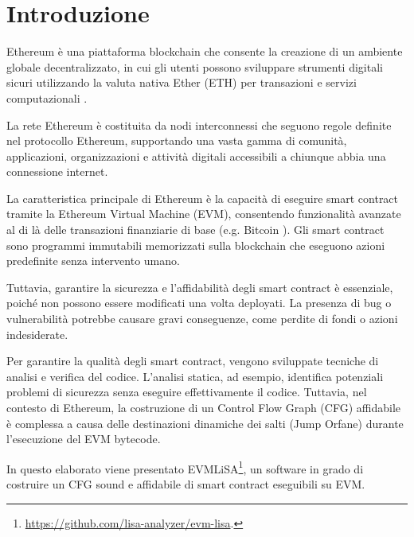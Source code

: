 \chapter{Introduzione}\label{chapter:introduzione}
Ethereum è una piattaforma blockchain che consente la creazione di un ambiente globale decentralizzato, 
in cui gli utenti possono sviluppare strumenti digitali sicuri utilizzando la valuta nativa Ether (ETH) per transazioni e servizi 
computazionali \cite{wood2014ethereum}.

La rete Ethereum è costituita da nodi interconnessi che seguono regole definite nel protocollo Ethereum, supportando una vasta 
gamma di comunità, applicazioni, organizzazioni e attività digitali accessibili a chiunque abbia una connessione internet.

La caratteristica principale di Ethereum è la capacità di eseguire smart contract tramite la Ethereum Virtual Machine (EVM), 
consentendo funzionalità avanzate al di là delle transazioni finanziarie di base (e.g. Bitcoin \cite{nakamoto2008bitcoin}). 
Gli smart contract sono programmi immutabili memorizzati sulla blockchain che eseguono azioni predefinite senza intervento umano.

Tuttavia, garantire la sicurezza e l’affidabilità degli smart contract è essenziale, poiché non possono essere modificati una 
volta deployati. La presenza di bug o vulnerabilità potrebbe causare gravi conseguenze, come perdite di fondi o azioni indesiderate.

Per garantire la qualità degli smart contract, vengono sviluppate tecniche di analisi e verifica del codice. L’analisi statica, 
ad esempio, identifica potenziali problemi di sicurezza senza eseguire effettivamente il codice. Tuttavia, nel contesto di Ethereum, 
la costruzione di un Control Flow Graph (CFG) affidabile è complessa a causa delle destinazioni dinamiche dei salti (Jump Orfane) 
durante l’esecuzione del EVM bytecode.

In questo elaborato viene presentato EVMLiSA\footnote{\url{https://github.com/lisa-analyzer/evm-lisa}.}, un software in grado di 
costruire un CFG sound e affidabile  di smart contract eseguibili su EVM.